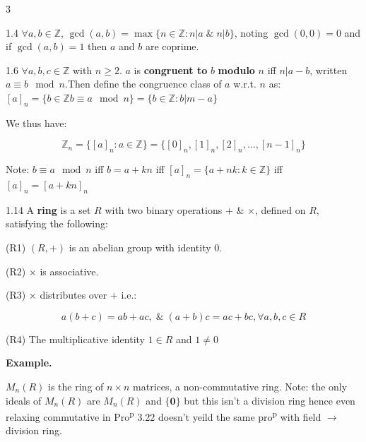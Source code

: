 \documentclass[8pt]{extarticle}
\newenvironment{example}{%
  \par\noindent
  \textbf{Example.}\ \normalfont
  \ignorespaces
}{%
  \par
}
\begin{document}
\begin{multicols}{3}
        \begin{definition}{1.4}
            \(\forall a,b\in\mathbb{Z}\), \(\gcd(a,b)=\max\{n\in\mathbb{Z}:n|a\;\&\;n|b\}\), noting \(\gcd(0,0)=0\) and if \(\gcd(a,b)=1\) then \(a\) and \(b\) are coprime.
        \end{definition}

        \begin{definition}{1.6}
            \(\forall a,b,c\in\mathbb{Z}\) with \(n\ge2\).
            \(a\) is \textbf{congruent to} \(b\) \textbf{modulo} \(n\) iff \(n|a-b\), written \(a\equiv b\mod n\).Then define the congruence class of \(a\) w.r.t. \(n\) as: \([a]_n=\{b\in\mathbb{Z}b\equiv a\mod n\}=\{b\in\mathbb{Z}:b|m-a\}\)
            
            We thus have: 
            
            \vspace{-15pt}
            \[\mathbb{Z}_n=\{[a]_n:a\in\mathbb{Z}\}=\{[0]_n,[1]_n,[2]_n,\ldots,[n-1]_n\}\]
            \vspace{-15pt}

            {\footnotesize Note: \(b\equiv a \mod n\) iff \(b=a+kn\) iff \([a]_n=\{a+nk:k\in\mathbb{Z}\}\) iff \([a]_n=[a+kn]_n\)}
        \end{definition}

        \begin{definition}{1.14}
            A \textbf{ring} is a set \(R\) with two binary operations \(+\) \& \(\times\), defined on \(R\), satisfying the following:

            (R1) \((R,+)\) is an abelian group with identity 0.

            (R2) \(\times\) is associative.

            (R3) \(\times\) distributes over \(+\) i.e.:

            \vspace{-15pt}
            \[a(b+c)=ab+ac,\;\&\;(a+b)c=ac+bc,\forall a,b,c\in R\]
            \vspace{-15pt}

            (R4) The multiplicative identity \(1\in R\) and \(1\ne0\)


        \end{definition}

        \begin{example}
            \(M_n(R)\) is the ring of \(n\times n\) matrices, a non-commutative ring.
            {\footnotesize Note: the only ideals of \(M_n(R)\) are \(M_n(R)\) and \(\{\mathbf{0}\}\) but this isn't a division ring hence even relaxing commutative in Pro\textsuperscript{p} 3.22 doesn't yeild the same pro\textsuperscript{p} with field \(\to\) division ring.}
        \end{example}


\end{multicols}
\end{document}
